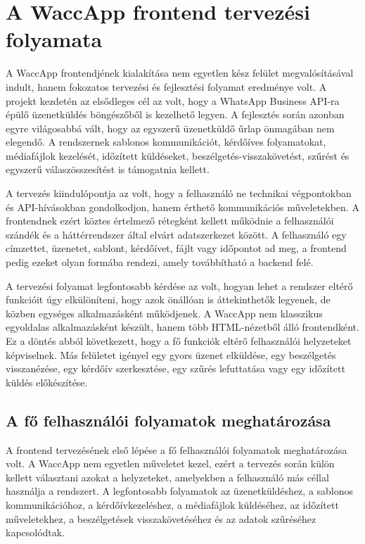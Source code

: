 \chapter{A WaccApp frontend tervezési folyamata}

A WaccApp frontendjének kialakítása nem egyetlen kész felület megvalósításával indult, hanem fokozatos tervezési és fejlesztési folyamat eredménye volt. A projekt kezdetén az elsődleges cél az volt, hogy a WhatsApp Business API-ra épülő üzenetküldés böngészőből is kezelhető legyen. A fejlesztés során azonban egyre világosabbá vált, hogy az egyszerű üzenetküldő űrlap önmagában nem elegendő. A rendszernek sablonos kommunikációt, kérdőíves folyamatokat, médiafájlok kezelését, időzített küldéseket, beszélgetés-visszakövetést, szűrést és egyszerű válaszösszesítést is támogatnia kellett.

A tervezés kiindulópontja az volt, hogy a felhasználó ne technikai végpontokban és API-hívásokban gondolkodjon, hanem érthető kommunikációs műveletekben. A frontendnek ezért köztes értelmező rétegként kellett működnie a felhasználói szándék és a háttérrendszer által elvárt adatszerkezet között. A felhasználó egy címzettet, üzenetet, sablont, kérdőívet, fájlt vagy időpontot ad meg, a frontend pedig ezeket olyan formába rendezi, amely továbbítható a backend felé.

A tervezési folyamat legfontosabb kérdése az volt, hogyan lehet a rendszer eltérő funkcióit úgy elkülöníteni, hogy azok önállóan is áttekinthetők legyenek, de közben egységes alkalmazásként működjenek. A WaccApp nem klasszikus egyoldalas alkalmazásként készült, hanem több HTML-nézetből álló frontendként. Ez a döntés abból következett, hogy a fő funkciók eltérő felhasználói helyzeteket képviselnek. Más felületet igényel egy gyors üzenet elküldése, egy beszélgetés visszanézése, egy kérdőív szerkesztése, egy szűrés lefuttatása vagy egy időzített küldés előkészítése.

\section{A fő felhasználói folyamatok meghatározása}

A frontend tervezésének első lépése a fő felhasználói folyamatok meghatározása volt. A WaccApp nem egyetlen műveletet kezel, ezért a tervezés során külön kellett választani azokat a helyzeteket, amelyekben a felhasználó más céllal használja a rendszert. A legfontosabb folyamatok az üzenetküldéshez, a sablonos kommunikációhoz, a kérdőívkezeléshez, a médiafájlok küldéséhez, az időzített műveletekhez, a beszélgetések visszakövetéséhez és az adatok szűréséhez kapcsolódtak.

